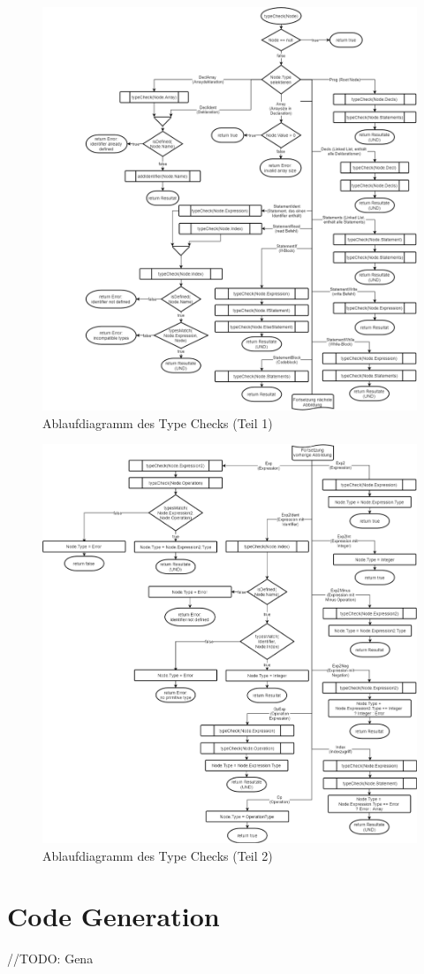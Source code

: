 \documentclass[
a4paper
]{scrreprt}
\begin{document}
\begin{figure}[htbp]
\centering
\includegraphics[width=\textwidth]{./images/TypeCheck1.png}
\caption{Ablaufdiagramm des Type Checks (Teil 1)}
\label{TypeCheck1}
\end{figure}

\begin{figure}[htbp]
\centering
\includegraphics[width=\textwidth]{./images/TypeCheck2.png}
\caption{Ablaufdiagramm des Type Checks (Teil 2)}
\label{TypeCheck2}
\end{figure}


\section{Code Generation}
//TODO: Gena
\end{document}
